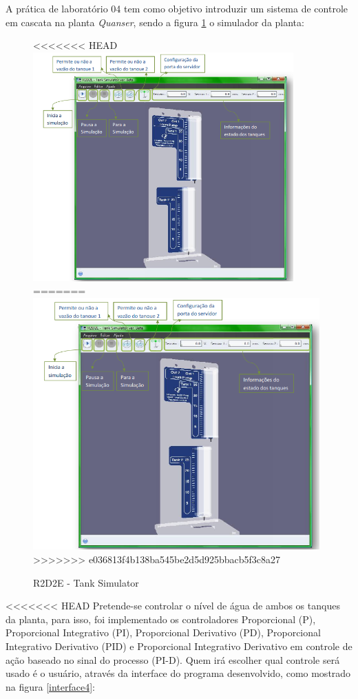 \documentclass[a4paper,12pt]{article}
\begin{document}
\begin{flushleft}
\hspace{4ex}A prática de laboratório 04 tem como objetivo introduzir um sistema de controle em cascata na planta \textit{Quanser}, sendo a figura \ref{r2d2e} o simulador da planta:

\begin{figure}[H]
\centering
<<<<<<< HEAD
\includegraphics[width=10cm]{simulator.png}
=======
\includegraphics[width=11cm]{ImagensLab4/simulator.png}
>>>>>>> e036813f4b138ba545be2d5d925bbacb5f3c8a27
\caption{R2D2E - Tank Simulator}
\label{r2d2e}
\end{figure}

<<<<<<< HEAD
\hspace{4ex}Pretende-se controlar o nível de água de ambos os tanques da planta, para isso, foi implementado os controladores Proporcional (P), Proporcional Integrativo (PI), Proporcional Derivativo (PD), Proporcional Integrativo Derivativo (PID) e Proporcional Integrativo Derivativo em controle de ação baseado no sinal do processo (PI-D). Quem irá escolher qual controle será usado é o usuário, através da interface do programa desenvolvido, como mostrado na figura  \ref{interface4}:


\end{flushleft}
\end{document}
